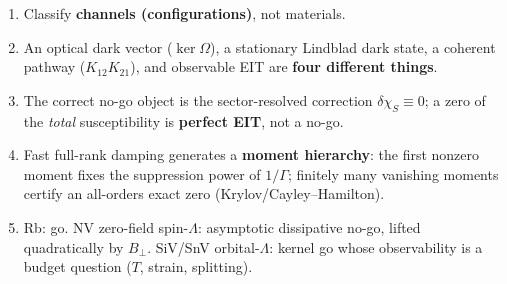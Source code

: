 \documentclass[11pt,a4paper]{article}
\theoremstyle{remark}
\newcommand{\dchi}{\delta\chi_{S}}
\begin{document}
\begin{keyidea}[Summary]
\begin{enumerate}
\item Classify \textbf{channels (configurations)}, not materials.
\item An optical dark vector ($\ker\Omega$), a stationary Lindblad dark
      state, a coherent pathway ($K_{12}K_{21}$), and observable EIT are
      \textbf{four different things}.
\item The correct no-go object is the sector-resolved correction
      $\dchi\equiv0$; a zero of the \emph{total} susceptibility is
      \textbf{perfect EIT}, not a no-go.
\item Fast full-rank damping generates a \textbf{moment hierarchy}: the first
      nonzero moment fixes the suppression power of $1/\Gamma$; finitely many
      vanishing moments certify an all-orders exact zero
      (Krylov/Cayley--Hamilton).
\item Rb: go. NV zero-field spin-$\Lambda$: asymptotic dissipative no-go,
      lifted quadratically by $B_\perp$. SiV/SnV orbital-$\Lambda$: kernel go
      whose observability is a budget question ($T$, strain, splitting).
\end{enumerate}
\end{keyidea}
\end{document}
